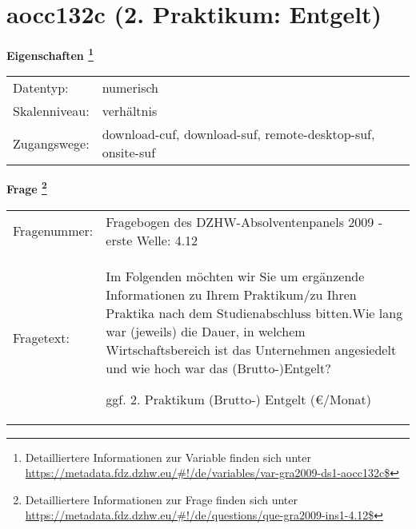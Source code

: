 
    \setcounter{footnote}{0}

    \vspace*{-1.8cm}
	\section{aocc132c (2. Praktikum: Entgelt)}
	\label{section:aocc132c}



    \vspace*{0.5cm}
    \noindent\textbf{Eigenschaften
	\footnote{Detailliertere Informationen zur Variable finden sich unter
		\url{https://metadata.fdz.dzhw.eu/\#!/de/variables/var-gra2009-ds1-aocc132c$}}}\\
	\begin{tabularx}{\hsize}{@{}lX}
	Datentyp: & numerisch \\
	Skalenniveau: & verhältnis \\
	Zugangswege: &
	  download-cuf, 
	  download-suf, 
	  remote-desktop-suf, 
	  onsite-suf
 \\
    \end{tabularx}



				\vspace*{0.5cm}
                \noindent\textbf{Frage
	                \footnote{Detailliertere Informationen zur Frage finden sich unter
		              \url{https://metadata.fdz.dzhw.eu/\#!/de/questions/que-gra2009-ins1-4.12$}}}\\
				\begin{tabularx}{\hsize}{@{}lX}
					Fragenummer: &
					  Fragebogen des DZHW-Absolventenpanels 2009 - erste Welle:
					  4.12
 \\
					Fragetext: & Im Folgenden möchten wir Sie um ergänzende Informationen zu Ihrem Praktikum/zu Ihren Praktika nach dem Studienabschluss bitten.Wie lang war (jeweils) die Dauer, in welchem Wirtschaftsbereich ist das Unternehmen angesiedelt und wie hoch war das (Brutto-)Entgelt?\par  ggf. 2. Praktikum (Brutto-) Entgelt (€/Monat) \\
				\end{tabularx}






